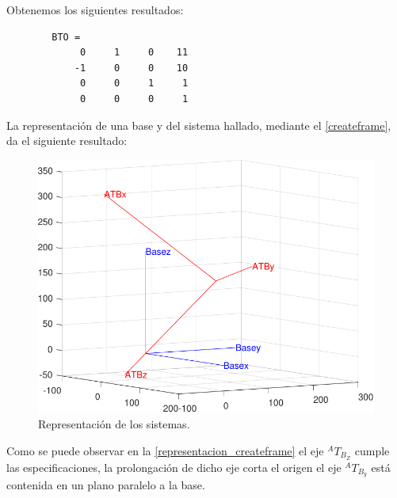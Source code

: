 \documentclass[11pt,a4paper]{article}
\begin{document}
        

    Obtenemos los siguientes resultados: 
    \begin{verbatim}
        BTO =
             0     1     0    11
            -1     0     0    10
             0     0     1     1
             0     0     0     1
    \end{verbatim}


    \begin{minipage}[c]{\linewidth}
        
        \end{minipage}    


    La representación de una base y del sistema hallado, mediante el \autoref{createframe},
    da el siguiente resultado:

    \begin{figure}[H]
        \centering
        \includegraphics[scale = 1]{images/robotica_tare2_problema_1.pdf}
        \caption{Representación de los sistemas.}
        \label{representacion_createframe}
    \end{figure}

Como se puede observar en la \autoref{representacion_createframe} el eje ${}^AT_{B_{Z}}$ cumple las especificaciones, la prolongación de dicho eje corta el origen el eje ${}^AT_{B_{y}}$ está contenida en un plano paralelo a la base.
    
\end{document}
